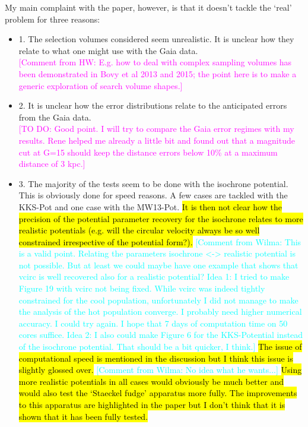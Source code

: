 \documentclass[10pt,a4paper]{article}
\newcommand{\Wilma}[1]{\textcolor{Magenta}{#1}}
\newcommand{\HW}[1]{\textcolor{Cyan}{#1}}
\begin{document}
My main complaint with the paper, however, is that it doesn't tackle the `real'
problem for three reasons:
\begin{itemize}
\item 1. The selection volumes considered seem unrealistic. It is unclear how they relate to what one might use with the Gaia data.\\
\Wilma{[Comment from HW: E.g. how to deal with complex sampling volumes has been demonstrated in Bovy et al 2013 and 2015; the point here is to make a generic exploration of search volume shapes.]}
\item 2. It is unclear how the error distributions relate to the anticipated errors from the Gaia data. \\
\Wilma{[TO DO: Good point. I will try to compare the Gaia error regimes with my results. Rene helped me already a little bit and found out that a magnitude cut at G=15 should keep the distance errors below 10\% at a maximum distance of 3 kpc.]}
\item 3. The majority of the tests seem to be done with the isochrone potential. This is obviously done for speed reasons. A few cases are tackled with the KKS-Pot and one
case with the MW13-Pot. \hl{It is then not clear how the precision of the potential
parameter recovery for the isochrone relates to more realistic potentials (e.g.
will the circular velocity always be so well constrained irrespective of the
potential form?).}
\HW{[Comment from Wilma: This is a valid point. Relating the parameters isochrone <-> realistic potential is not possible. But at least we could maybe have one example that shows that vcirc is well recovered also for a realistic potential? Idea 1: I tried to make Figure 19 with vcirc not being fixed. While vcirc was indeed tightly constrained for the cool population, unfortunately I did not manage to make the analysis of the hot population converge. I probably need higher numerical accuracy. I could try again. I hope that 7 days of computation time on 50 cores suffice. Idea 2: I also could make Figure 6 for the KKS-Potential instead of the isochrone potential. That should be a bit quicker, I think.]}
\hl{The issue of computational speed is mentioned in the discussion
but I think this issue is slightly glossed over.}
\HW{[Comment from Wilma: No idea what he wants...]}
\hl{Using more realistic potentials in all cases would obviously be much better and would also test the `Staeckel fudge'
apparatus more fully. The improvements to this apparatus are highlighted in the paper but I don't think that it is shown that it has been fully tested.} 

\end{itemize}
\end{document}
